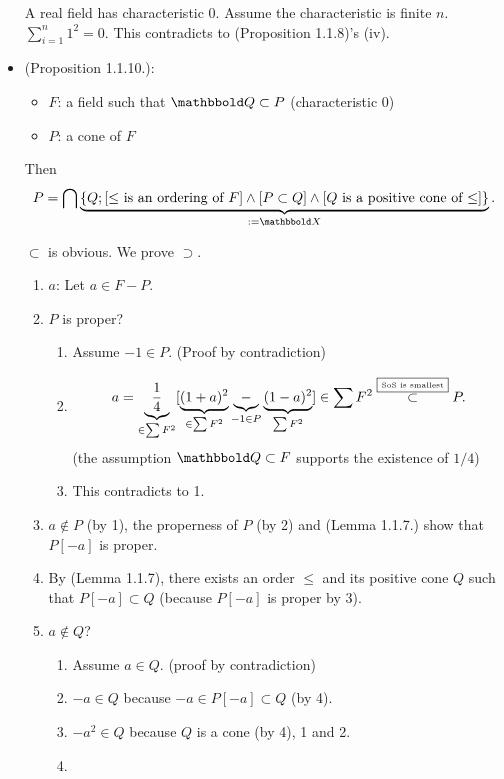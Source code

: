 \documentclass[9pt]{ltjsarticle}
\newcommand{\bbold}{\mathbbold}
\begin{document}
\begin{itemize}
  A real field has characteristic 0.
  \pf
  Assume the characteristic is finite $n$.
  $\sum_{i=1}^n 1^2 = 0$.  This contradicts to (Proposition 1.1.8)'s (iv).
  \item
  (Proposition 1.1.10.):
  \begin{itemize}
    \item $F$: a field such that $\Q \subset P$ (characteristic 0)
    \item $P$: a cone of $F$
  \end{itemize}
  Then
  \begin{align}
     P = \bigcap \ub{\set{Q; [\text{$\le$ is an ordering of $F$}] \land [P\subset Q] \land [\text{$Q$ is a positive cone of $\le$}]}}_{\defeq \bbold X}.
  \end{align}

  \pf
  $\subset $ is obvious.  We prove $\supset$.
  \begin{enumerate}
    \item $a$: Let $a\in F-P$.
    \item $P$ is proper?
    \begin{enumerate}
      \item Assume $-1 \in P$.  (Proof by contradiction)
      \item
      \begin{align}
        a = \underbrace{\frac{1}{4}}_{\in \sum F^2} [\underbrace{(1+a)^2}_{\in \sum F^2} \underbrace{-}_{-1 \in P} \underbrace{(1-a)^2}_{\sum F^2}] \in \sum F^2 \overset{\text{\fbox{\tiny SoS is smallest}}}{\subset} P.
      \end{align}
      (the assumption $\Q \subset F$ supports the existence of $1/4$)
      \item
      This contradicts to 1.
    \end{enumerate}
    \item
    $a\notin P$ (by 1), the properness of $P$ (by 2) and (Lemma 1.1.7.)
    show that $P[-a]$ is proper.
    \item
    By (Lemma 1.1.7), there exists an order $\le$ and its positive cone $Q$ such that $P[-a]\subset Q$ (because $P[-a]$ is proper by 3).
    \item
    $a \notin Q$?
    \begin{enumerate}
      \item Assume $a \in Q$. (proof by contradiction)
      \item $-a \in Q$ because $-a \in P[-a] \subset Q$ (by 4).
      \item
      $-a^2 \in Q$ because $Q$ is a cone (by 4), 1 and 2.
      \item

\end{enumerate}
\end{enumerate}
\end{itemize}
\end{document}
